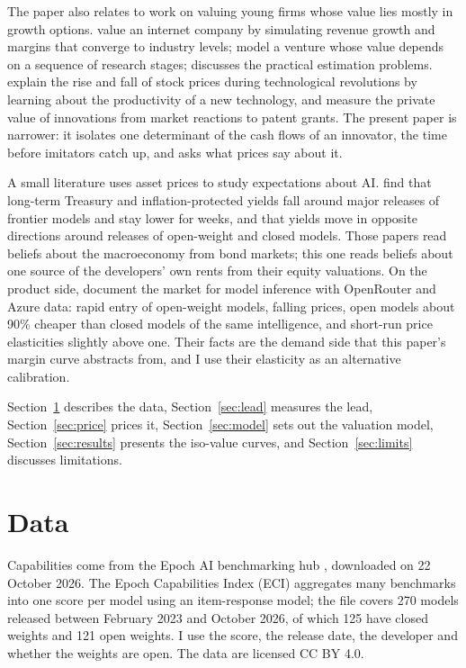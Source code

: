 \documentclass[12pt]{article}
\begin{document}
The paper also relates to work on valuing young firms whose value lies mostly in growth options. \citet{schwartz2000internet} value an internet company by simulating revenue growth and margins that converge to industry levels; \citet{berk2004valuation} model a venture whose value depends on a sequence of research stages; \citet{damodaran2009young} discusses the practical estimation problems. \citet{pastor2009revolutions} explain the rise and fall of stock prices during technological revolutions by learning about the productivity of a new technology, and \citet{kogan2017innovation} measure the private value of innovations from market reactions to patent grants. The present paper is narrower: it isolates one determinant of the cash flows of an innovator, the time before imitators catch up, and asks what prices say about it.

A small literature uses asset prices to study expectations about AI. \citet{andrews2026markets} find that long-term Treasury and inflation-protected yields fall around major releases of frontier models and stay lower for weeks, and \citet{bjorkegren2025open} that yields move in opposite directions around releases of open-weight and closed models. Those papers read beliefs about the macroeconomy from bond markets; this one reads beliefs about one source of the developers' own rents from their equity valuations. On the product side, \citet{demirer2025market,demirer2026jep} document the market for model inference with OpenRouter and Azure data: rapid entry of open-weight models, falling prices, open models about 90\% cheaper than closed models of the same intelligence, and short-run price elasticities slightly above one. Their facts are the demand side that this paper's margin curve abstracts from, and I use their elasticity as an alternative calibration.

Section~\ref{sec:data} describes the data, Section~\ref{sec:lead} measures the lead, Section~\ref{sec:price} prices it, Section~\ref{sec:model} sets out the valuation model, Section~\ref{sec:results} presents the iso-value curves, and Section~\ref{sec:limits} discusses limitations.

\section{Data}\label{sec:data}

Capabilities come from the Epoch AI benchmarking hub \citep{epoch2026benchmarks}, downloaded on 22 October 2026. The Epoch Capabilities Index (ECI) aggregates many benchmarks into one score per model using an item-response model; the file covers 270 models released between February 2023 and October 2026, of which 125 have closed weights and 121 open weights. I use the score, the release date, the developer and whether the weights are open. The data are licensed CC BY 4.0.
\end{document}

